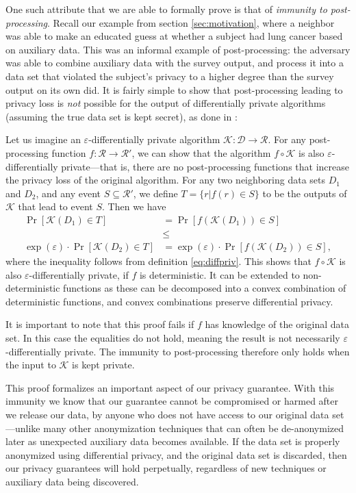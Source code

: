 \documentclass[12pt]{article}
\newcommand{\todo}[1]{{\color{red}#1}}
\newcommand{\fancy}{\mathcal}
\renewcommand{\epsilon}{\varepsilon}
\begin{document}
One such attribute that we are able to formally prove is that of \emph{immunity to post-processing}. Recall our example from section \ref{sec:motivation}, where a neighbor was able to make an educated guess at whether a subject had lung cancer based on auxiliary data. This was an informal example of post-processing: the adversary was able to combine auxiliary data with the survey output, and process it into a data set that violated the subject's privacy to a higher degree than the survey output on its own did. It is fairly simple to show that post-processing leading to privacy loss is \emph{not} possible for the output of differentially private algorithms (assuming the true data set is kept secret), as done in \cite{dwork_privacybook}:

Let us imagine an $\epsilon$-differentially private algorithm $\fancy{K} : \fancy{D} \to \fancy{R}$. For any post-processing function $f : \fancy{R} \to \fancy{R}'$, we can show that the algorithm $f \circ \fancy{K}$ is also $\epsilon$-differentially private---that is, there are no post-processing functions that increase the privacy loss of the original algorithm. For any two neighboring data sets $D_1$ and $D_2$, and any event $S \subseteq \fancy{R}'$, we define $T = \{r|f(r) \in S\}$ to be the outputs of $\fancy{K}$ that lead to event $S$. Then we have
\begin{align*}
    \Pr[\fancy{K}(D_1) \in T] &= \Pr[f(\fancy{K}(D_1)) \in S]  \\
    &\leq \\
    \exp(\epsilon)\cdot\Pr[\fancy{K}(D_2) \in T] &= \exp(\epsilon)\cdot\Pr[f(\fancy{K}(D_2)) \in S],
\end{align*}
where the inequality follows from definition \ref{eq:diffpriv}. This shows that $f \circ \fancy{K}$ is also $\epsilon$-differentially private, if $f$ is deterministic. It can be extended to non-deterministic functions \todo{as these can be decomposed into a convex combination of deterministic functions, and convex combinations preserve differential privacy}.

It is important to note that this proof fails if $f$ has knowledge of the original data set. In this case the equalities do not hold, meaning the result is not necessarily $\epsilon$-differentially private. The immunity to post-processing therefore only holds when the input to $\fancy{K}$ is kept private. \bigskip

This proof formalizes an important aspect of our privacy guarantee. With this immunity we know that our guarantee cannot be compromised or harmed after we release our data, by anyone who does not have access to our original data set---unlike many other anonymization techniques that can often be de-anonymized later as unexpected auxiliary data becomes available. If the data set is properly anonymized using differential privacy, and the original data set is discarded, then our privacy guarantees will hold perpetually, regardless of new techniques or auxiliary data being discovered.
\end{document}
